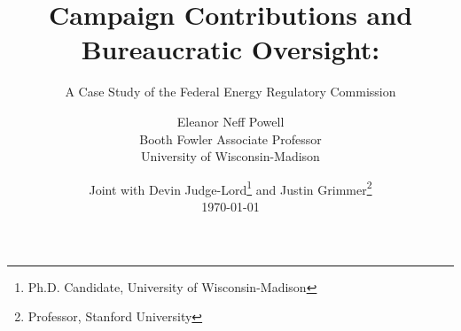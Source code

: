 \documentclass[13pt]{beamer}
\title{Campaign Contributions and Bureaucratic Oversight:}
\subtitle{A Case Study of the Federal Energy Regulatory Commission}
\author[Judge-Lord, Grimmer, Powell]{Eleanor Neff Powell \\ Booth Fowler Associate Professor \\ University of Wisconsin-Madison}
\date[\today]{Joint with Devin Judge-Lord\thanks{Ph.D. Candidate, University of Wisconsin-Madison} and Justin Grimmer\thanks{Professor, Stanford University} \\ \bigskip \today}
\begin{document}
\begin{frame}
\maketitle
\end{frame}





\end{document}
